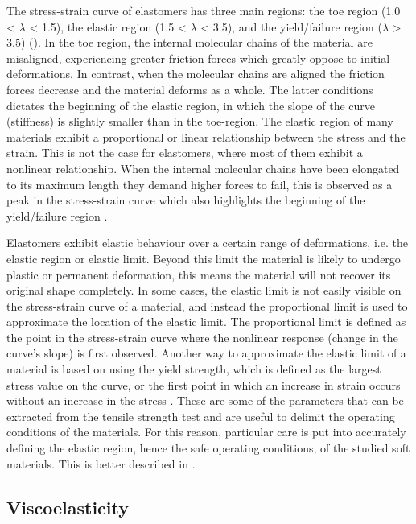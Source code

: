 The stress-strain curve of elastomers has three main regions: the toe region (1.0 < $\lambda$ < 1.5), the elastic region (1.5 < $\lambda$ < 3.5), and the yield/failure region ($\lambda$ > 3.5) (). In the toe region, the internal molecular chains of the material are misaligned, experiencing greater friction forces which greatly oppose to initial deformations. In contrast, when the molecular chains are aligned the friction forces decrease and the material deforms as a whole. The latter conditions dictates the beginning of the elastic region, in which the slope of the curve (stiffness) is slightly smaller than in the toe-region. The elastic region of many materials exhibit a proportional or linear relationship between the stress and the strain. This is not the case for elastomers, where most of them exhibit a nonlinear relationship. When the internal molecular chains have been elongated to its maximum length they demand higher forces to fail, this is observed as a peak in the stress-strain curve which also highlights the beginning of the yield/failure region \cite{Bauman2008}.

Elastomers exhibit elastic behaviour over a certain range of deformations, i.e. the elastic region or elastic limit. Beyond this limit the material is likely to undergo plastic or permanent deformation, this means the material will not recover its original shape completely. In some cases, the elastic limit is not easily visible on the stress-strain curve of a material, and instead the proportional limit is used to approximate the location of the elastic limit. The proportional limit is defined as the point in the stress-strain curve where the nonlinear response (change in the curve's slope) is first observed. Another way to approximate the elastic limit of a material is based on using the yield strength, which is defined as the largest stress value on the curve, or the first point in which an increase in strain occurs without an increase in the stress \cite{ebewele2000}. These are some of the parameters that can be extracted from the tensile strength test and are useful to delimit the operating conditions of the materials. For this reason, particular care is put into accurately defining the elastic region, hence the safe operating conditions, of the studied soft materials. This is better described in .

\subsection{Viscoelasticity}

